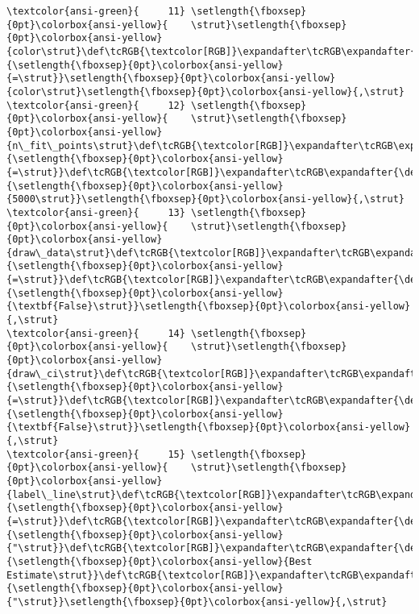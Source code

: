 \documentclass[11pt]{article}
\begin{document}
\begin{Verbatim}[commandchars=\\\{\}, frame=single, framerule=2mm, rulecolor=\color{outerrorbackground}]
\textcolor{ansi-green}{     11} \setlength{\fboxsep}{0pt}\colorbox{ansi-yellow}{    \strut}\setlength{\fboxsep}{0pt}\colorbox{ansi-yellow}{color\strut}\def\tcRGB{\textcolor[RGB]}\expandafter\tcRGB\expandafter{\detokenize{98,98,98}}{\setlength{\fboxsep}{0pt}\colorbox{ansi-yellow}{=\strut}}\setlength{\fboxsep}{0pt}\colorbox{ansi-yellow}{color\strut}\setlength{\fboxsep}{0pt}\colorbox{ansi-yellow}{,\strut}
\textcolor{ansi-green}{     12} \setlength{\fboxsep}{0pt}\colorbox{ansi-yellow}{    \strut}\setlength{\fboxsep}{0pt}\colorbox{ansi-yellow}{n\_fit\_points\strut}\def\tcRGB{\textcolor[RGB]}\expandafter\tcRGB\expandafter{\detokenize{98,98,98}}{\setlength{\fboxsep}{0pt}\colorbox{ansi-yellow}{=\strut}}\def\tcRGB{\textcolor[RGB]}\expandafter\tcRGB\expandafter{\detokenize{98,98,98}}{\setlength{\fboxsep}{0pt}\colorbox{ansi-yellow}{5000\strut}}\setlength{\fboxsep}{0pt}\colorbox{ansi-yellow}{,\strut}
\textcolor{ansi-green}{     13} \setlength{\fboxsep}{0pt}\colorbox{ansi-yellow}{    \strut}\setlength{\fboxsep}{0pt}\colorbox{ansi-yellow}{draw\_data\strut}\def\tcRGB{\textcolor[RGB]}\expandafter\tcRGB\expandafter{\detokenize{98,98,98}}{\setlength{\fboxsep}{0pt}\colorbox{ansi-yellow}{=\strut}}\def\tcRGB{\textcolor[RGB]}\expandafter\tcRGB\expandafter{\detokenize{0,135,0}}{\setlength{\fboxsep}{0pt}\colorbox{ansi-yellow}{\textbf{False}\strut}}\setlength{\fboxsep}{0pt}\colorbox{ansi-yellow}{,\strut}
\textcolor{ansi-green}{     14} \setlength{\fboxsep}{0pt}\colorbox{ansi-yellow}{    \strut}\setlength{\fboxsep}{0pt}\colorbox{ansi-yellow}{draw\_ci\strut}\def\tcRGB{\textcolor[RGB]}\expandafter\tcRGB\expandafter{\detokenize{98,98,98}}{\setlength{\fboxsep}{0pt}\colorbox{ansi-yellow}{=\strut}}\def\tcRGB{\textcolor[RGB]}\expandafter\tcRGB\expandafter{\detokenize{0,135,0}}{\setlength{\fboxsep}{0pt}\colorbox{ansi-yellow}{\textbf{False}\strut}}\setlength{\fboxsep}{0pt}\colorbox{ansi-yellow}{,\strut}
\textcolor{ansi-green}{     15} \setlength{\fboxsep}{0pt}\colorbox{ansi-yellow}{    \strut}\setlength{\fboxsep}{0pt}\colorbox{ansi-yellow}{label\_line\strut}\def\tcRGB{\textcolor[RGB]}\expandafter\tcRGB\expandafter{\detokenize{98,98,98}}{\setlength{\fboxsep}{0pt}\colorbox{ansi-yellow}{=\strut}}\def\tcRGB{\textcolor[RGB]}\expandafter\tcRGB\expandafter{\detokenize{175,0,0}}{\setlength{\fboxsep}{0pt}\colorbox{ansi-yellow}{"\strut}}\def\tcRGB{\textcolor[RGB]}\expandafter\tcRGB\expandafter{\detokenize{175,0,0}}{\setlength{\fboxsep}{0pt}\colorbox{ansi-yellow}{Best Estimate\strut}}\def\tcRGB{\textcolor[RGB]}\expandafter\tcRGB\expandafter{\detokenize{175,0,0}}{\setlength{\fboxsep}{0pt}\colorbox{ansi-yellow}{"\strut}}\setlength{\fboxsep}{0pt}\colorbox{ansi-yellow}{,\strut}

\end{Verbatim}
\end{document}
